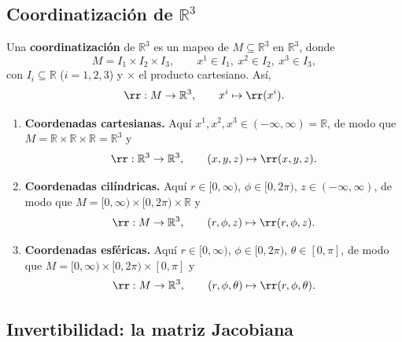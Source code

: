 \subsection{Coordinatización de \texorpdfstring{$\mathbb{R}^3$}{R3}}

\begin{definicion}
Una \textbf{coordinatización} de $\mathbb{R}^3$ es un mapeo de $M\subseteq\mathbb{R}^3$ en $\mathbb{R}^3$, donde
\begin{equation}
M = I_1\times I_2 \times I_3, \qquad x^1\in I_1,\ x^2\in I_2,\ x^3\in I_3,
\end{equation}
con $I_i\subseteq\mathbb{R}$ ($i=1,2,3$) y $\times$ el producto cartesiano. Así,
\begin{equation}
\rr : M \to \mathbb{R}^3, \qquad x^i \mapsto \rr(x^i).
\end{equation}
\end{definicion}

\begin{ejemplo}
\begin{enumerate}[label=\alph*)]
\item \textbf{Coordenadas cartesianas.} Aquí $x^1,x^2,x^3\in(-\infty,\infty)=\mathbb{R}$, de modo que $M=\mathbb{R}\times\mathbb{R}\times\mathbb{R}=\mathbb{R}^3$ y
\begin{equation}
\rr:\mathbb{R}^3\to\mathbb{R}^3, \qquad (x,y,z)\mapsto \rr(x,y,z).
\end{equation}
\item \textbf{Coordenadas cilíndricas.} Aquí $r\in[0,\infty)$, $\phi\in[0,2\pi)$, $z\in(-\infty,\infty)$, de modo que $M=[0,\infty)\times[0,2\pi)\times\mathbb{R}$ y
\begin{equation}
\rr:M\to\mathbb{R}^3, \qquad (r,\phi,z)\mapsto \rr(r,\phi,z).
\end{equation}
\item \textbf{Coordenadas esféricas.} Aquí $r\in[0,\infty)$, $\phi\in[0,2\pi)$, $\theta\in[0,\pi]$, de modo que $M=[0,\infty)\times[0,2\pi)\times[0,\pi]$ y
\begin{equation}
\rr:M\to\mathbb{R}^3, \qquad (r,\phi,\theta)\mapsto \rr(r,\phi,\theta).
\end{equation}
\end{enumerate}
\end{ejemplo}

\subsection{Invertibilidad: la matriz Jacobiana}

